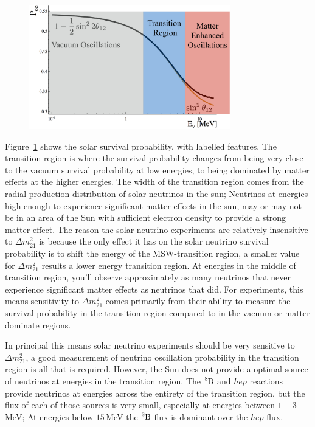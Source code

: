 \begin{figure}[htbp]
    \centering
    \includegraphics[width=0.78\textwidth]{labelled_survival_probability}
    \caption[]{}
    \label{fig:labelled_pee}
\end{figure}

Figure~\ref{fig:labelled_pee} shows the solar survival probability,
with labelled features.
The transition region is where the survival probability changes from
being very close to the vacuum survival probability at low energies,
to being dominated by matter effects at the higher energies.
The width of the transition region comes from the radial production
distribution of solar neutrinos in the sun;
Neutrinos at energies high enough to experience significant matter
effects in the sun, may or may not be in an area of the Sun with sufficient
electron density to provide a strong matter effect.
The reason the solar neutrino experiments are relatively insensitive
to $\Delta m^{2}_{21}$ is because the only effect it has on the
solar neutrino survival probability is to shift the energy
of the MSW-transition region, a smaller value for $\Delta m^{2}_{21}$ results
a lower energy transition region.
At energies in the middle of transition region, you'll observe approximately
as many neutrinos that never experience significant matter effects as neutrinos
that did.
For experiments, this means sensitivity to $\Delta m^{2}_{21}$ comes
primarily from their ability to measure the survival probability in the
transition region compared to in the vacuum or matter dominate regions.

In principal this means solar neutrino experiments should be very sensitive
to $\Delta m^{2}_{21}$, a good measurement of neutrino oscillation probability
in the transition region is all that is required.
However, the Sun does not provide a optimal source of neutrinos at energies
in the transition region.
The $\ce{^{8}B}$ and $hep$ reactions provide neutrinos at energies across the
entirety of the transition region, but the flux of each of those sources is
very small, especially at energies between $1-3$\,MeV\@;
At energies below $15$\,MeV the $\ce{^{8}B}$ flux is dominant over the $hep$
flux.


